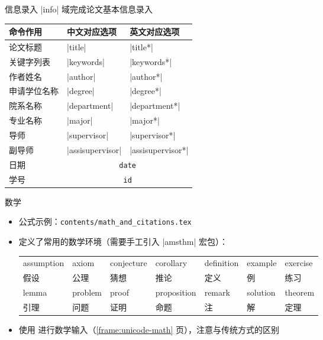 \begin{frame}[fragile]{信息录入}
  |info| 域完成论文基本信息录入
  \begin{table}[h]
    \centering
    \footnotesize
    \begin{tabular}{lll} \toprule
      命令作用     & 中文对应选项                      & 英文对应选项      \\ \midrule
      论文标题     & |title|                           & |title*|          \\
      关键字列表   & |keywords|                        & |keywords*|       \\
      作者姓名     & |author|                          & |author*|         \\
      申请学位名称 & |degree|                          & |degree*|         \\
      院系名称     & |department|                      & |department*|     \\
      专业名称     & |major|                           & |major*|          \\
      导师         & |supervisor|                      & |supervisor*|     \\
      副导师       & |assisupervisor|                  & |assisupervisor*| \\
      日期         & \multicolumn{2}{c}{\texttt{date}}                     \\
      学号         & \multicolumn{2}{c}{\texttt{id}}                       \\ \bottomrule
    \end{tabular}
  \end{table}
\end{frame}

\begin{frame}[fragile]{数学}
  \begin{itemize}
    \item 公式示例：\nolinkurl{contents/math_and_citations.tex}
    \item \SJTUThesis{} 定义了常用的数学环境（需要手工引入 |amsthm| 宏包）：
          \begin{table}[h]
            \centering
            \footnotesize
            \begin{tabular}{*{7}{l}}\toprule
              assumption & axiom   & conjecture & corollary   & definition & example  & exercise \\
              假设       & 公理    & 猜想       & 推论        & 定义       & 例       & 练习     \\\midrule
              lemma      & problem & proof      & proposition & remark     & solution & theorem  \\
              引理       & 问题    & 证明       & 命题        & 注         & 解       & 定理     \\\bottomrule
            \end{tabular}
          \end{table}
    \item \SJTUThesis{} 使用  进行数学输入（\ref{frame:unicode-math} 页），注意与传统方式的区别
  \end{itemize}
\end{frame}

